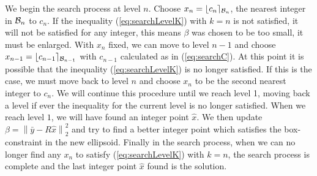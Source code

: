 \documentclass[conference]{IEEEtran}
\begin{document}
We begin the search process
at level $n$. Choose $x_n = \lfloor c_n \rceil_{{\cal B}_n}$, the nearest
integer in ${\cal B}_n$ to $c_n$. If the inequality (\ref{eq:searchLevelK}) with $k=n$
is not satisfied, it will not be satisfied for any integer, this means $\beta$
was chosen to be too small, it must be enlarged. With $x_n$ fixed, we can move
to level $n-1$ and choose $x_{n-1} = \lfloor c_{n-1} \rceil_{{\cal B}_{n-1}}$ with $c_{n-1}$ calculated as in (\ref{eq:searchC}). At this point it
is possible that the inequality (\ref{eq:searchLevelK}) is no longer satisfied.
If this is the case, we must move back to level $n$ and choose $x_n$ to be the
second nearest integer to $c_n$.  We will continue this procedure until we reach
level 1, moving back a level if ever the inequality for the current level is no
longer satisfied.
When we reach level $1$, we will have found an integer point $\hat{x}$. We then
update $\beta = \left \| \bar{y} - R\hat{x} \right \|_2^2$ and try
to find a better integer point which satisfies the box-constraint in the new
ellipsoid. Finally in the search process, when we can no longer find any $x_n$
to satisfy (\ref{eq:searchLevelK}) with $k=n$, the search process is complete and the last integer
point $\hat{x}$ found is the solution. %
\end{document}
